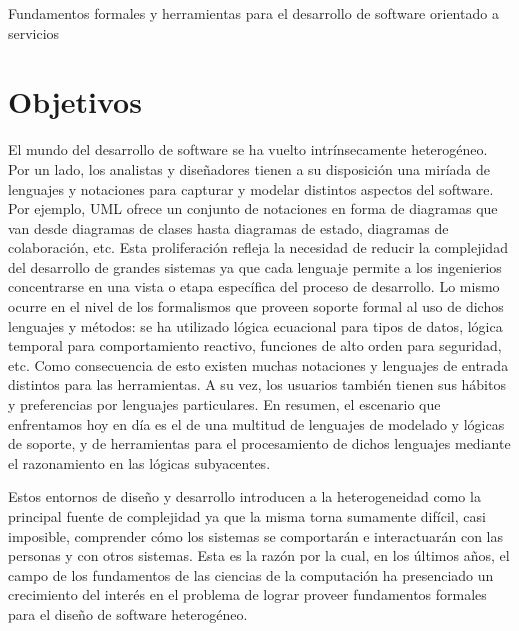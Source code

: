 \documentclass{article}
\begin{document}
\begin{Large}
 \begin{center}
    Fundamentos formales y herramientas para el desarrollo de software orientado a servicios
 \end{center}

\end{Large}


\section{Objetivos}
  El mundo del desarrollo de software se ha vuelto intr\'insecamente heterog\'eneo. Por un lado, los analistas y dise\~nadores tienen a su disposici\'on una mir\'iada de lenguajes y notaciones para capturar y modelar distintos aspectos del software. Por ejemplo, UML \cite{omg-sysml04,omg-ocl04} ofrece un conjunto de notaciones en forma de diagramas que van desde diagramas de clases hasta diagramas de estado, diagramas de colaboraci\'on, etc. Esta proliferaci\'on refleja la necesidad de reducir la complejidad del desarrollo de grandes sistemas ya que cada lenguaje permite a los ingenierios concentrarse en una vista o etapa espec\'ifica del proceso de desarrollo. Lo mismo ocurre en el nivel de los formalismos que proveen soporte formal al uso de dichos lenguajes y m\'etodos: se ha utilizado l\'ogica ecuacional para tipos de datos, l\'ogica temporal para comportamiento reactivo, funciones de alto orden para seguridad, etc. Como consecuencia de esto existen muchas notaciones y lenguajes de entrada distintos para 
las herramientas. A su vez, los usuarios tambi\'en tienen sus h\'abitos y preferencias por lenguajes particulares. En resumen, el escenario que enfrentamos hoy en d\'ia es el de una multitud de lenguajes de modelado y l\'ogicas de soporte, y de herramientas para el procesamiento de dichos lenguajes mediante el razonamiento en las l\'ogicas subyacentes.
  
  Estos entornos de dise\~no y desarrollo introducen a la heterogeneidad como la principal fuente de complejidad ya que la misma torna sumamente dif\'icil, casi imposible, comprender c\'omo los sistemas se comportar\'an e interactuar\'an con las personas y con otros sistemas. Esta es la raz\'on por la cual, en los \'ultimos a\~nos, el campo de los fundamentos de las ciencias de la computaci\'on ha presenciado un crecimiento del inter\'es en el problema de lograr proveer fundamentos formales para el dise\~no de software heterog\'eneo.
  
\end{document}

